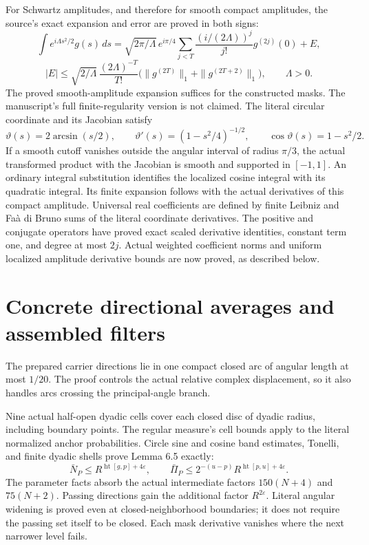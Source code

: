 \documentclass[11pt]{article}
\begin{document}
For Schwartz amplitudes, and therefore for smooth compact amplitudes, the
source's exact expansion and error are proved in both signs:
\[
\int e^{i\Lambda s^2/2}g(s)\,ds
=\sqrt{2\pi/\Lambda}\,e^{i\pi/4}
\sum_{j<T}\frac{(i/(2\Lambda))^j}{j!}g^{(2j)}(0)+E,
\]
\[
|E|\le\sqrt{2/\Lambda}\,\frac{(2\Lambda)^{-T}}{T!}
\bigl(\|g^{(2T)}\|_1+\|g^{(2T+2)}\|_1\bigr),\qquad \Lambda>0.
\]
The proved smooth-amplitude expansion suffices for the constructed masks.
The manuscript's full finite-regularity version is not claimed.
The literal circular coordinate and its Jacobian satisfy
\[
\vartheta(s)=2\arcsin(s/2),\qquad
\vartheta'(s)=(1-s^2/4)^{-1/2},\qquad
\cos\vartheta(s)=1-s^2/2.
\]
If a smooth cutoff vanishes outside the angular interval of radius $\pi/3$,
the actual transformed product with the Jacobian is smooth and supported
in $[-1,1]$. An ordinary integral substitution identifies the localized
cosine integral with its quadratic integral. Its finite expansion follows
with the actual derivatives of this compact amplitude. Universal real
coefficients are defined by finite Leibniz and Faà di Bruno sums of the
literal coordinate derivatives. The positive and conjugate operators have
proved exact scaled derivative identities, constant term one, and degree at
most $2j$. Actual weighted coefficient norms and uniform localized amplitude
derivative bounds are now proved, as described below.

\newpage
\section*{Concrete directional averages and assembled filters}
The prepared carrier directions lie in one compact closed arc of angular
length at most $1/20$. The proof controls the actual relative complex
displacement, so it also handles arcs crossing the principal-angle branch.

Nine actual half-open dyadic cells cover each closed disc of dyadic radius,
including boundary points. The regular measure's cell bounds apply to the
literal normalized anchor probabilities. Circle sine and cosine band
estimates, Tonelli, and finite dyadic shells prove Lemma 6.5 exactly:
\[
\bar N_P\le R^{\operatorname{ht}[g,p]+4\varepsilon},\qquad
\bar\Pi_P\le 2^{-(u-p)}R^{\operatorname{ht}[p,u]+4\varepsilon}.
\]
The parameter facts absorb the actual intermediate factors $150(N+4)$ and
$75(N+2)$. Passing directions gain the additional factor $R^{2\varepsilon}$.
Literal angular widening is proved even at closed-neighborhood boundaries;
it does not require the passing set itself to be closed. Each mask derivative
vanishes where the next narrower level fails.
\end{document}
